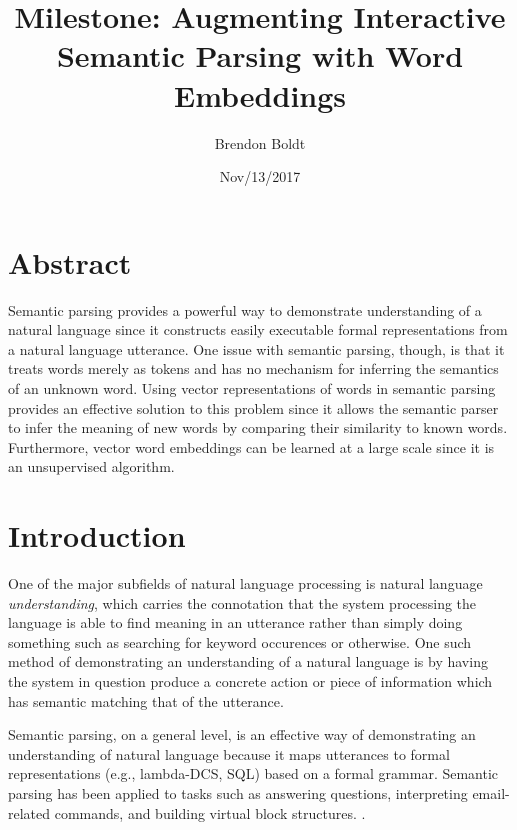 \documentclass[a4paper]{article}
\title{Milestone: Augmenting Interactive Semantic Parsing with Word Embeddings}
\author{Brendon Boldt}
\date{Nov/13/2017}
\begin{document}





\maketitle


\section*{Abstract}

Semantic parsing provides a powerful way to demonstrate understanding of a
natural language since it constructs easily executable formal
representations from a natural language utterance. One issue with semantic parsing, though,
is that it treats words merely as tokens and has no mechanism for inferring
the semantics of an unknown word. Using vector representations of words
in semantic parsing provides an effective solution to this problem since
it allows the semantic parser to infer the meaning of new words by comparing
their similarity to known words. Furthermore, vector word embeddings can
be learned at a large scale since it is an unsupervised algorithm.

\section{Introduction}

One of the major subfields of natural language processing is natural language
\textit{understanding}, which carries the connotation that the system processing
the language is able to find meaning in an utterance rather than simply
doing something such as searching for keyword occurences or otherwise. %
One such method of demonstrating an understanding of a natural language is
by having the system in question produce a concrete action or piece of
information which has semantic matching that of the utterance.

Semantic parsing, on a general level, is an effective way of demonstrating an
understanding of natural language because it maps utterances to
formal representations (e.g., lambda-DCS, SQL) based on a formal grammar.
Semantic parsing has been applied to tasks such as answering questions,
interpreting email-related commands, and building virtual block structures.
\cite{AAAI1612383}
\cite{DBLP:conf/emnlp/BerantCFL13}
\cite{DBLP:journals/corr/WangGLM17}.
\end{document}

